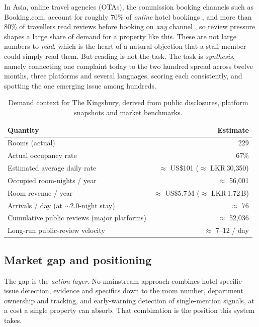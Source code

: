 \documentclass[11pt,a4paper]{article}
\begin{document}
In Asia, online travel agencies (OTAs), the commission booking channels such as Booking.com, account for
roughly 70\% of \emph{online} hotel bookings \citep{asia2024ota}, and more than 80\% of travellers read
reviews before booking on \emph{any} channel \citep{tripadvisor2019reviews}, so review pressure shapes a
large share of demand for a property like this. These are not large numbers to \emph{read}, which is the
heart of a natural objection that a staff member could simply read them. But reading is not the task.
The task is \emph{synthesis}, namely connecting one complaint today to the two hundred spread across
twelve months, three platforms and several languages, scoring each consistently, and spotting the one
emerging issue among hundreds.

\begin{table}[H]
\centering
\caption{Demand context for The Kingsbury, derived from public disclosures, platform snapshots and
market benchmarks.}
\label{tab:demand}
\begin{tabularx}{\linewidth}{Xr}
\toprule
\textbf{Quantity} & \textbf{Estimate} \\
\midrule
Rooms (actual) & 229 \\
Actual occupancy rate & 67\% \\
Estimated average daily rate & $\approx$ US\$101 ($\approx$ LKR\,30{,}350) \\
Occupied room-nights / year & $\approx$ 56{,}001 \\
Room revenue / year & $\approx$ US\$5.7\,M ($\approx$ LKR\,1.72\,B) \\
Arrivals / day (at $\sim$2.0-night stay) & $\approx$ 76 \\
Cumulative public reviews (major platforms) & $\approx$ 52{,}036 \\
Long-run public-review velocity & $\approx$ 7--12 / day \\
\bottomrule
\end{tabularx}
\end{table}

\subsection{Market gap and positioning}
The gap is the \emph{action layer}. No mainstream approach combines hotel-specific issue detection,
evidence and specifics down to the room number, department ownership and tracking, and early-warning
detection of single-mention signals, at a cost a single property can absorb. That combination is the
position this system takes.
\end{document}
